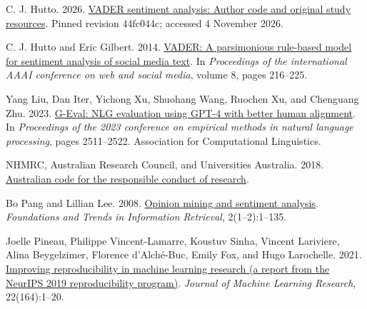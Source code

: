 \documentclass[11pt]{article}
\begin{document}
\begin{thebibliography}{}
 \hypertarget{ref_huttoCode}{}C. J. Hutto. 2026. \href{https://github.com/cjhutto/vaderSentiment/tree/44fc044cd877310ee8278a0eadf34bcd50d41d06}{VADER sentiment analysis: Author code and original study resources}. Pinned revision 44fc044c; accessed 4 November 2026.

 \hypertarget{ref_hutto2014vader}{}C. J. Hutto and Eric Gilbert. 2014. \href{https://doi.org/10.1609/icwsm.v8i1.14550}{VADER: A parsimonious rule-based model for sentiment analysis of social media text}. In \emph{Proceedings of the international AAAI conference on web and social media}, volume 8, pages 216--225.

 \hypertarget{ref_liu2023geval}{}Yang Liu, Dan Iter, Yichong Xu, Shuohang Wang, Ruochen Xu, and Chenguang Zhu. 2023. \href{https://doi.org/10.18653/v1/2023.emnlp-main.153}{G-Eval: NLG evaluation using GPT-4 with better human alignment}. In \emph{Proceedings of the 2023 conference on empirical methods in natural language processing}, pages 2511--2522. Association for Computational Linguistics.

 \hypertarget{ref_researchCode}{}NHMRC, Australian Research Council, and Universities Australia. 2018. \href{https://www.nhmrc.gov.au/about-us/publications/australian-code-responsible-conduct-research-2018}{Australian code for the responsible conduct of research}.

 \hypertarget{ref_pang2008opinion}{}Bo Pang and Lillian Lee. 2008. \href{https://www.cs.cornell.edu/home/llee/opinion-mining-sentiment-analysis-survey.html}{Opinion mining and sentiment analysis}. \emph{Foundations and Trends in Information Retrieval}, 2(1--2):1--135.

 \hypertarget{ref_pineau2021reproducibility}{}Joelle Pineau, Philippe Vincent-Lamarre, Koustuv Sinha, Vincent Lariviere, Alina Beygelzimer, Florence d'Alché-Buc, Emily Fox, and Hugo Larochelle. 2021. \href{https://www.jmlr.org/papers/v22/20-303.html}{Improving reproducibility in machine learning research (a report from the NeurIPS 2019 reproducibility program)}. \emph{Journal of Machine Learning Research}, 22(164):1--20.


\end{thebibliography}
\end{document}
